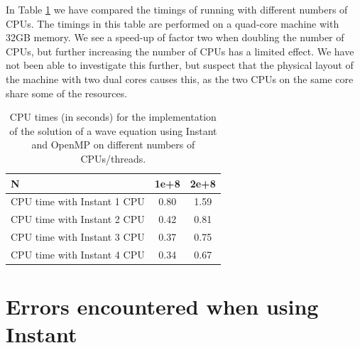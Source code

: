 In Table \ref{speed-up2} we have compared the timings of running with
different numbers of CPUs. The timings in this table are performed on
a quad-core machine with 32GB memory. We see a speed-up of factor two
when doubling the number of CPUs, but further increasing the number of
CPUs has a limited effect. We have not been able to investigate this
further, but suspect that the physical layout of the machine with two
dual cores causes this, as the two CPUs on the same core share some of
the resources.
\begin{table}
\begin{center}
\begin{tabular}{|l|c|c|} \hline
N                     & 1e+8     &2e+8 \\ \hline
CPU time with Instant 1 CPU & 0.80  & 1.59  \\ \hline
CPU time with Instant 2 CPU & 0.42  & 0.81  \\ \hline
CPU time with Instant 3 CPU & 0.37  & 0.75  \\ \hline
CPU time with Instant 4 CPU & 0.34  & 0.67  \\ \hline
\end{tabular}
\caption{CPU times (in seconds) for the implementation of the solution of a wave equation
using Instant and OpenMP on different numbers of CPUs/threads.}
\label{speed-up2}
\end{center}
\end{table}

\section{Errors encountered when using Instant}

